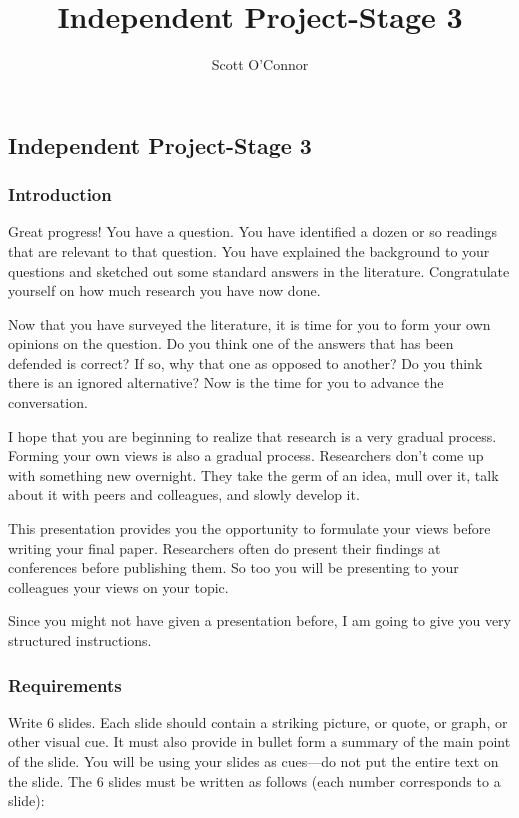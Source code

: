 \documentclass[]{article}
\title{Independent Project-Stage 3}
\author{Scott O’Connor}
\begin{document}
\maketitle

\subsection{Independent Project-Stage
3}\label{independent-project-stage-3}

\subsubsection{Introduction}\label{introduction}

Great progress! You have a question. You have identified a dozen or so
readings that are relevant to that question. You have explained the
background to your questions and sketched out some standard answers in
the literature. Congratulate yourself on how much research you have now
done.

Now that you have surveyed the literature, it is time for you to form
your own opinions on the question. Do you think one of the answers that
has been defended is correct? If so, why that one as opposed to another?
Do you think there is an ignored alternative? Now is the time for you to
advance the conversation.

I hope that you are beginning to realize that research is a very gradual
process. Forming your own views is also a gradual process. Researchers
don't come up with something new overnight. They take the germ of an
idea, mull over it, talk about it with peers and colleagues, and slowly
develop it.

This presentation provides you the opportunity to formulate your views
before writing your final paper. Researchers often do present their
findings at conferences before publishing them. So too you will be
presenting to your colleagues your views on your topic.

Since you might not have given a presentation before, I am going to give
you very structured instructions.

\subsubsection{Requirements}\label{requirements}

Write 6 slides. Each slide should contain a striking picture, or quote,
or graph, or other visual cue. It must also provide in bullet form a
summary of the main point of the slide. You will be using your slides as
cues---do not put the entire text on the slide. The 6 slides must be
written as follows (each number corresponds to a slide):
\end{document}
